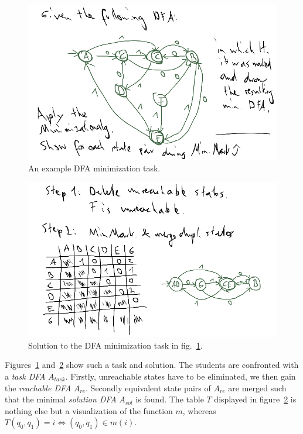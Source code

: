 \begin{figure}
\includegraphics[width=\linewidth]{images/dfa_ex_task.png}
\caption{An example DFA minimization task.}
\label{fig:dfa_ex_task}
\end{figure}

\begin{figure}
\includegraphics[width=\linewidth]{images/dfa_ex_sol.png}
\caption{Solution to the DFA minimization task in fig.~\ref{fig:dfa_ex_task}.}
\label{fig:dfa_ex_sol}
\end{figure}

\noindent Figures~\ref{fig:dfa_ex_task} and~\ref{fig:dfa_ex_sol} show such a task and solution. The students are confronted with a \emph{task DFA} $A_{task}$. Firstly, unreachable states have to be eliminated, we then gain the \emph{reachable DFA} $A_{re}$. Secondly equivalent state pairs of $A_{re}$ are merged such that the minimal \emph{solution DFA} $A_{sol}$ is found. The table $T$ displayed in figure~\ref{fig:dfa_ex_sol} is nothing else but a visualization of the function $m$, whereas $T(q_0, q_1) = i \Leftrightarrow (q_0, q_1) \in m(i)$.

